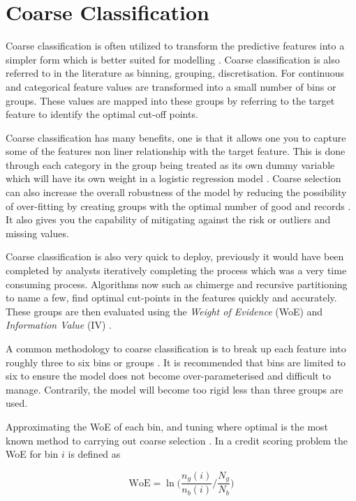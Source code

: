 \section{Coarse Classification} \label{sec:binning}
Coarse classification is often utilized to transform the predictive features into a simpler form which is better suited for modelling \citep{carroll_transformation_1988}. Coarse classification is also referred to in the literature as binning, grouping, discretisation. For continuous and categorical feature values are transformed into a small number of bins or groups. These values  are mapped into these groups by referring to the target feature to identify the optimal cut-off points. 

Coarse classification has many benefits, one is that it allows one you to capture some of the features non liner relationship with the target feature. This is done through each category in the group being treated as its own dummy variable which will have its own weight in a logistic regression model \citep{hand_optimal_2005}. Coarse selection can also increase the overall robustness of the model by reducing the possibility of over-fitting by creating groups with the optimal number of good and records \citep{baesens_50_2009}. It also gives you the capability of mitigating against the risk or outliers and missing values. 

Coarse classification is also very quick to deploy, previously it would have been completed by analysts iteratively completing the process which was a very time consuming process. Algorithms now such as chimerge and recursive partitioning to name a few, find optimal cut-points in the features quickly and accurately. These groups are then evaluated using the \textit{Weight of Evidence} (WoE) and \textit{Information Value} (IV) \citep{garcia_survey_2013}. 

A common methodology to coarse classification is to break up each feature into roughly three to six bins or groups \citep{hand_optimal_2005}. It is recommended that bins are limited to six to ensure the model does not become over-parameterised and difficult to manage. Contrarily, the model will become too rigid less than three groups are used. 

Approximating the WoE of each bin, and tuning where optimal is the most known method to carrying out coarse selection \citep{thomas_consumer_2009}. In a credit scoring problem the WoE for bin $i$ is defined as 
  
\begin{equation} \label{eq:woe}
\text{WoE} =  \ln\bigg(\frac{n_g(i)}{n_b(i)} \bigg/ \frac{N_g}{N_b}\bigg)
\end{equation}

